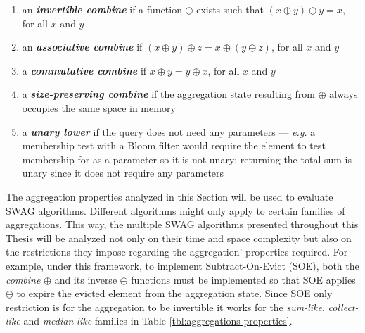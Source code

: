\begin{enumerate}
    \item  an \textbf{\textit{invertible combine}} if a function $\ominus$ exists such that $(x \oplus y) \ominus y = x$, for all $x$ and $y$
    
    \item  an \textbf{\textit{associative combine}} if $(x \oplus y) \oplus z = x \oplus (y \oplus z)$, for all $x$ and $y$
    
    \item  a \textbf{\textit{commutative combine}} if $x \oplus y = y \oplus x$, for all $x$ and $y$
    
    \item  a \textbf{\textit{size-preserving combine}} if the aggregation state resulting from $\oplus$ always occupies the same space in memory
   
    \item  a \textbf{\textit{unary lower}} if the query does not need any parameters --- \textit{e.g.} a membership test with a Bloom filter would require the element to test membership for as a parameter so it is not unary; returning the total sum is unary since it does not require any parameters
\end{enumerate}


The aggregation properties analyzed in this Section will be used to evaluate SWAG algorithms. Different algorithms might only apply to certain families of aggregations. This way, the multiple SWAG algorithms presented throughout this Thesis will be analyzed not only on their time and space complexity but also on the restrictions they impose regarding the aggregation' properties required. For example, under this framework, to implement Subtract-On-Evict (SOE), both the \textit{combine} $\oplus$ and its inverse $\ominus$ functions must be implemented so that SOE applies $\ominus$ to expire the evicted element from the aggregation state. Since SOE only restriction is for the aggregation to be invertible it works for the \textit{sum-like}, \textit{collect-like} and \textit{median-like} families in Table \ref{tbl:aggregations-properties}.




